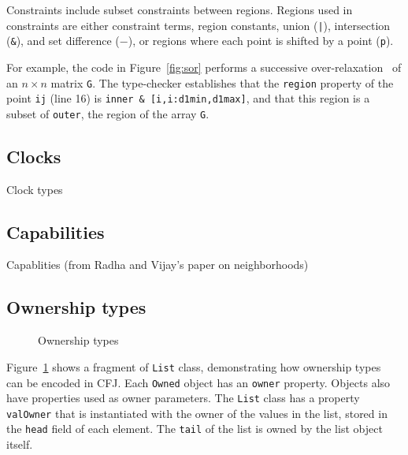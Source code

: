 Constraints include subset constraints between regions.
Regions used in constraints are either constraint terms,
region constants, union ({\tt |}), intersection ({\tt \&}), and
set difference ($-$), or regions where each point is
shifted by a point ({\tt p}).


\begin{figure*}

\caption{Successive over-relaxation with regions}
\label{fig:sor}
\end{figure*}

For example, the code in Figure~\ref{fig:sor} performs a successive
over-relaxation~\cite{sor} of an $n \times n$ matrix {\tt G}.
The type-checker establishes that the {\tt region}
property of the point {\tt ij} (line 16) is
{\tt inner \& [i,i:d1min,d1max]}, and that this
region is a subset of {\tt outer}, the region of the array {\tt G}.

%

\subsection{Clocks}

Clock types

\subsection{Capabilities}

Capablities (from Radha and Vijay's paper on neighborhoods)

\subsection{Ownership types}

\begin{figure}

\caption{Ownership types}
\label{fig:ownership}
\end{figure}

Figure~\ref{fig:ownership} shows
 a fragment of {\tt List} class, 
demonstrating how ownership
types~\cite{ownership-types} can be encoded in CFJ.
Each {\tt Owned} object has an {\tt owner} property.
Objects also have properties used as owner parameters.
The {\tt List} class has a property {\tt valOwner} that is
instantiated with the owner of the values in the list, stored
in the {\tt head} field of each element.
The {\tt tail} of the list is owned by the list object itself.

